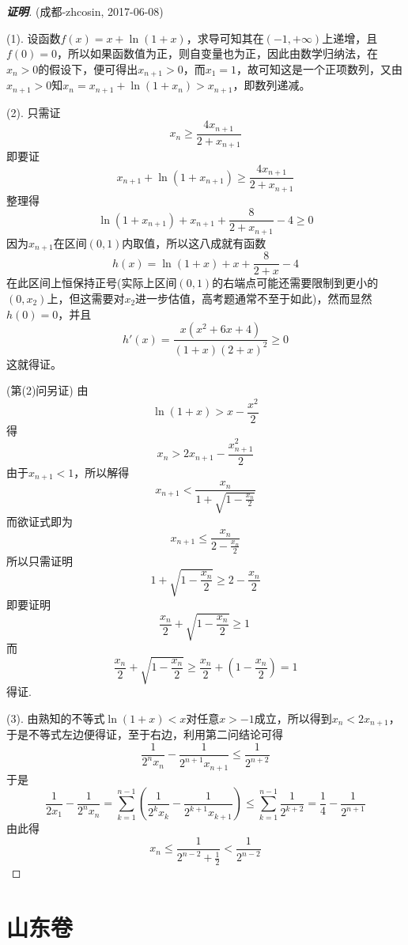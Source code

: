 \documentclass{ctexart}
\begin{document}
\begin{proof}[\textbf{证明}] (成都-zhcosin, 2017-06-08)

  (1). 设函数$f(x)=x+\ln{(1+x)}$，求导可知其在$(-1,+\infty)$上递增，且$f(0)=0$，所以如果函数值为正，则自变量也为正，因此由数学归纳法，在$x_n>0$的假设下，便可得出$x_{n+1}>0$，而$x_1=1$，故可知这是一个正项数列，又由$x_{n+1}>0$知$x_n=x_{n+1}+\ln{(1+x_n)}>x_{n+1}$，即数列递减。

  (2). 只需证
  \[ x_n \geqslant \frac{4x_{n+1}}{2+x_{n+1}} \]
  即要证
  \[ x_{n+1}+\ln{(1+x_{n+1})} \geqslant \frac{4x_{n+1}}{2+x_{n+1}} \]
  整理得
  \[ \ln{(1+x_{n+1})} + x_{n+1} + \frac{8}{2+x_{n+1}} -4 \geqslant 0 \]
  因为$x_{n+1}$在区间$(0,1)$内取值，所以这八成就有函数
  \[ h(x)=\ln{(1+x)}+x+\frac{8}{2+x}-4 \]
  在此区间上恒保持正号(实际上区间$(0,1)$的右端点可能还需要限制到更小的$(0,x_2)$上，但这需要对$x_2$进一步估值，高考题通常不至于如此)，然而显然$h(0)=0$，并且
  \[ h'(x) = \frac{x(x^2+6x+4)}{(1+x)(2+x)^2} \geqslant 0 \]
  这就得证。

  (第(2)问另证)
  由
  \[ \ln{(1+x)} > x-\frac{x^2}{2} \]
  得
  \[ x_n > 2x_{n+1}-\frac{x_{n+1}^2}{2} \]
  由于$x_{n+1}<1$，所以解得
  \[ x_{n+1} < \frac{x_n}{1+\sqrt{1-\frac{x_n}{2}}} \]
  而欲证式即为
  \[ x_{n+1} \leqslant \frac{x_n}{2-\frac{x_n}{2}} \]
  所以只需证明
  \[ 1+\sqrt{1-\frac{x_n}{2}} \geqslant 2-\frac{x_n}{2} \]
  即要证明
  \[ \frac{x_n}{2} + \sqrt{1-\frac{x_n}{2}} \geqslant 1 \ \]
  而
  \[ \frac{x_n}{2} + \sqrt{1-\frac{x_n}{2}} \geqslant \frac{x_n}{2} + \left( 1-\frac{x_n}{2} \right) = 1 \]
  得证.

  (3). 由熟知的不等式$\ln{(1+x)}<x$对任意$x>-1$成立，所以得到$x_n<2x_{n+1}$，于是不等式左边便得证，至于右边，利用第二问结论可得
  \[ \frac{1}{2^nx_n}-\frac{1}{2^{n+1}x_{n+1}} \leqslant \frac{1}{2^{n+2}} \]
  于是
  \[ \frac{1}{2x_1} - \frac{1}{2^nx_n} = \sum_{k=1}^{n-1} \left( \frac{1}{2^kx_k}-\frac{1}{2^{k+1}x_{k+1}} \right) \leqslant \sum_{k=1}^{n-1}\frac{1}{2^{k+2}}=\frac{1}{4}-\frac{1}{2^{n+1}} \]
  由此得
  \[ x_n \leqslant \frac{1}{2^{n-2}+\frac{1}{2}} <\frac{1}{2^{n-2}} \]
\end{proof}

\section{山东卷}
\label{sec:shandong}
\end{document}
